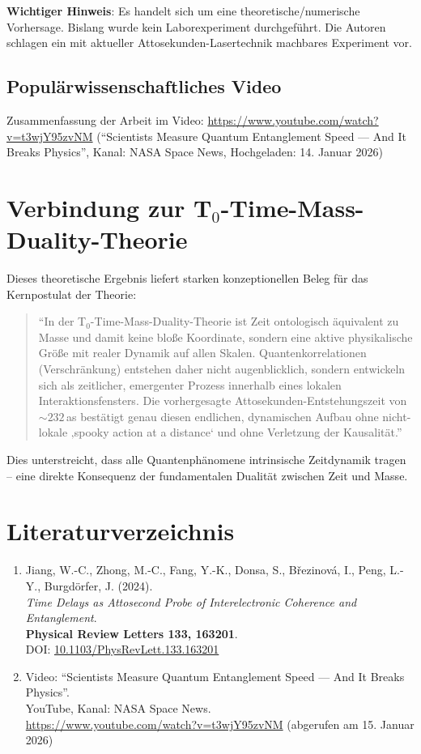 	\textbf{Wichtiger Hinweis}: Es handelt sich um eine theoretische/numerische Vorhersage. Bislang wurde kein Laborexperiment durchgeführt. Die Autoren schlagen ein mit aktueller Attosekunden-Lasertechnik machbares Experiment vor.
	
	\subsection{Populärwissenschaftliches Video}
	Zusammenfassung der Arbeit im Video:  
	\url{https://www.youtube.com/watch?v=t3wjY95zvNM}  
	(``Scientists Measure Quantum Entanglement Speed — And It Breaks Physics'', Kanal: NASA Space News, Hochgeladen: 14. Januar 2026)
	
	\section{Verbindung zur T$_0$-Time-Mass-Duality-Theorie}
	Dieses theoretische Ergebnis liefert starken konzeptionellen Beleg für das Kernpostulat der Theorie:
	
	\begin{quote}
		``In der T$_0$-Time-Mass-Duality-Theorie ist Zeit ontologisch äquivalent zu Masse und damit keine bloße Koordinate, sondern eine aktive physikalische Größe mit realer Dynamik auf allen Skalen. Quantenkorrelationen (Verschränkung) entstehen daher nicht augenblicklich, sondern entwickeln sich als zeitlicher, emergenter Prozess innerhalb eines lokalen Interaktionsfensters. Die vorhergesagte Attosekunden-Entstehungszeit von $\sim 232$\,as bestätigt genau diesen endlichen, dynamischen Aufbau ohne nicht-lokale ‚spooky action at a distance‘ und ohne Verletzung der Kausalität.''
	\end{quote}
	
	Dies unterstreicht, dass alle Quantenphänomene intrinsische Zeitdynamik tragen – eine direkte Konsequenz der fundamentalen Dualität zwischen Zeit und Masse.
	
	\section{Literaturverzeichnis}
	\begin{enumerate}[leftmargin=*]
		\item Jiang, W.-C., Zhong, M.-C., Fang, Y.-K., Donsa, S., Březinová, I., Peng, L.-Y., Burgdörfer, J. (2024). \\
		\emph{Time Delays as Attosecond Probe of Interelectronic Coherence and Entanglement}. \\
		\textbf{Physical Review Letters 133, 163201}. \\
		DOI: \href{https://doi.org/10.1103/PhysRevLett.133.163201}{10.1103/PhysRevLett.133.163201}
		\item Video: ``Scientists Measure Quantum Entanglement Speed — And It Breaks Physics''. \\
		YouTube, Kanal: NASA Space News. \\
		\url{https://www.youtube.com/watch?v=t3wjY95zvNM} (abgerufen am 15. Januar 2026)
	\end{enumerate}
	